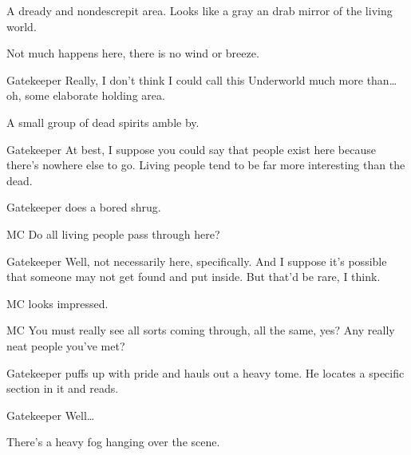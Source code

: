 

A dready and nondescrepit area.
Looks like a gray an drab mirror of the living world.

Not much happens here, there is no wind or breeze.

\begin{dialogue}[VO]{Gatekeeper}
Really, I don't think I could call this Underworld much more than\ldots
oh, some elaborate holding area.
\end{dialogue}

A small group of dead spirits amble by.

\begin{dialogue}[VO]{Gatekeeper}
At best, I suppose you could say that people exist here because there's nowhere else to go.
Living people tend to be far more interesting than the dead.
\end{dialogue}


Gatekeeper does a bored shrug.

\begin{dialogue}{MC}
Do all living people pass through here?
\end{dialogue}

\begin{dialogue}{Gatekeeper}
Well, not necessarily here, specifically.
And I suppose it's possible that someone may not get found and put inside.
But that'd be rare, I think.
\end{dialogue}

MC looks impressed.

\begin{dialogue}{MC}
You must really see all sorts coming through, all the same, yes?
Any really neat people you've met?
\end{dialogue}

Gatekeeper puffs up with pride and hauls out a heavy tome.
He locates a specific section in it and reads.

\begin{dialogue}{Gatekeeper}
Well\ldots
\end{dialogue}


There's a heavy fog hanging over the scene.

